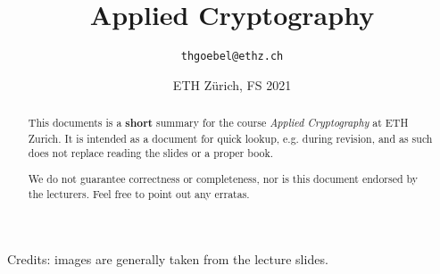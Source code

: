 \documentclass[paper=a4, parskip=half-]{scrartcl}
\title{Applied Cryptography}
\author{\texttt{thgoebel@ethz.ch}}
\date{ETH Zürich, FS 2021}
\begin{document}
\begin{titlepage}
\maketitle
\vspace{5cm}
\thispagestyle{empty}


\begin{abstract}
This documents is a \textbf{short} summary for the course \textit{Applied Cryptography} at ETH Zurich.
It is intended as a document for quick lookup, e.g. during revision, and as such does not replace reading the slides or a proper book.

We do not guarantee correctness or completeness, nor is this document endorsed by the lecturers.
Feel free to point out any erratas.
\end{abstract}

\end{titlepage}

\tableofcontents
\listoffigures

Credits: images are generally taken from the lecture slides.
\newpage


\newpage

% 
\end{document}
